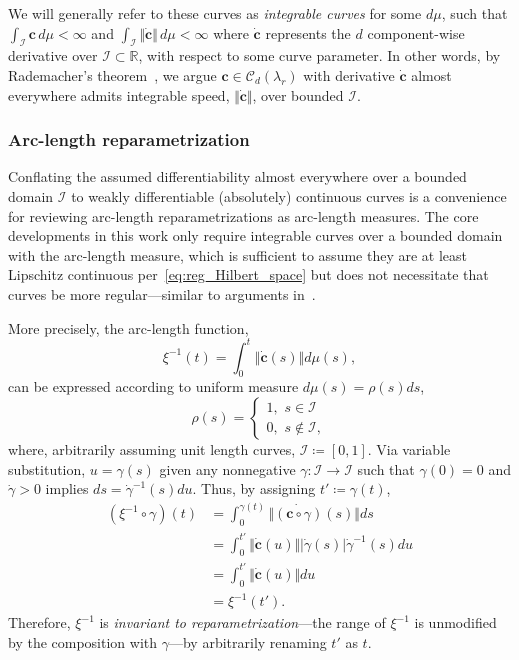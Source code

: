 \documentclass[pdflatex,iicol]{sn-jnl}%
\theoremstyle{thmstyleone}%
\theoremstyle{thmstyletwo}%
\theoremstyle{thmstylethree}%
\begin{document}
We will generally refer to these curves as \emph{integrable curves} for some $d\mu$, such that $\int_{\mathcal{I}} \boldsymbol{c} \,d\mu < \infty$ and $\int_{\mathcal{I}} \Vert \dot{\boldsymbol{c}} \Vert\, d\mu < \infty$ where $\dot{\boldsymbol{c}}$ represents the $d$ component-wise derivative over $\mathcal{I} \subset \mathbb{R}$, with respect to some curve parameter. In other words, by Rademacher's theorem~\cite{rudin1987real}, we argue $\boldsymbol{c} \in \mathcal{C}_d(\lambda_r)$ with derivative $\dot{\boldsymbol{c}}$ almost everywhere admits integrable speed, $\Vert \dot{\boldsymbol{c}}\Vert$, over bounded $\mathcal{I}$.

\subsubsection{Arc-length reparametrization}
Conflating the assumed differentiability almost everywhere over a bounded domain $\mathcal{I}$ to weakly differentiable (absolutely) continuous curves is a convenience for reviewing arc-length reparametrizations as arc-length measures. The core developments in this work only require integrable curves over a bounded domain with the arc-length measure, which is sufficient to assume they are at least Lipschitz continuous per~\eqref{eq:reg_Hilbert_space} but does not necessitate that curves be more regular---similar to arguments in~\cite{srivastava2010shape,bruveris2016optimal}.

More precisely, the arc-length function,
\begin{equation}
    \xi^{-1}(t) = \int_{0}^t \Vert \dot{\boldsymbol{c}}(s) \Vert d\mu(s),
\end{equation}
can be expressed according to uniform measure $d\mu(s) = \rho(s)ds$, 
\begin{equation}
    \rho(s) = \begin{cases}
                    1, \,\, s \in \mathcal{I}\\
                    0, \,\, s \notin \mathcal{I},
              \end{cases}
\end{equation} 
where, arbitrarily assuming unit length curves, $\mathcal{I} \coloneqq [0,1]$. Via variable substitution, $u = \gamma(s)$ given any nonnegative $\gamma:\mathcal{I} \rightarrow\mathcal{I}$ such that $\gamma(0) = 0$ and $\dot{\gamma} > 0$ implies $ds = \dot{\gamma}^{-1}(s)du$. Thus, by assigning $t' \coloneqq \gamma(t)$,
\begin{align}
    (\xi^{-1}\circ \gamma)(t) &= \int_0^{\gamma(t)}\Vert \dot{(\boldsymbol{c}\circ \gamma)}(s)\Vert ds \\ \nonumber
    &= \int_0^{t'} \Vert \dot{\boldsymbol{c}}(u) \Vert \vert \dot{\gamma}(s) \vert \dot{\gamma}^{-1}(s)du \\ \nonumber
    &= \int_0^{t'}\Vert \dot{\boldsymbol{c}}(u) \Vert du\\ \nonumber
    &= \xi^{-1}(t')\nonumber.
\end{align}
Therefore, $\xi^{-1}$ is \textit{invariant to reparametrization}---the range of $\xi^{-1}$ is unmodified by the composition with $\gamma$---by arbitrarily renaming $t'$ as $t$. 
\end{document}
